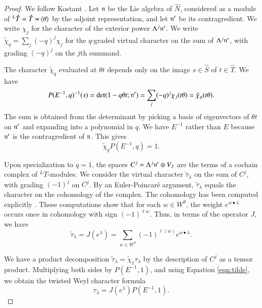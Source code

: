 \begin{proof} We follow Kostant \cite{kostant1961lie}.
Let ${\mathfrak n}$ be the Lie algebra of $\hat N$, considered as a module of ${}^L\hat T=\hat T\rtimes\langle{\theta}\rangle$ by the adjoint representation,
and let ${\mathfrak n}'$ be its contragredient.  We write $\chi_j$ for the character of the exterior power $\Lambda^j {\mathfrak n}'$.
  We write $\tilde\chi_q = \sum_j (-q)^j\chi_j$
for the $q$-graded virtual character on the sum of $\Lambda^j {\mathfrak n}'$, with grading $(-q)^j$ on the $j$th summand.  

The character $\tilde\chi_q$ evaluated at $\theta t$ depends only on the image $s\in\hat S$ of $t\in \hat T$.
We have 
\[
P(E^{-1},q)^{-1}(s) = \det(1- q\theta t;{\mathfrak n}') = \sum_j (-q)^j \chi_j(t\theta) = \tilde\chi_q(t\theta).
\]
The sum is obtained from
 the determinant  by picking a basis of eigenvectors of $\theta t$ on ${\mathfrak n}'$ and expanding into a polynomial
in $q$.
We have $E^{-1}$ rather than $E$ because ${\mathfrak n}'$ is the contragredient of ${\mathfrak n}$.
This gives
\begin{equation}\label{eqn:tilde}
\tilde\chi_q P(E^{-1},q) = 1.
\end{equation}

Upon specialization to $q=1$, 
the spaces $C^j=\Lambda^j {\mathfrak n}'\otimes V_\lambda$ are the terms of a cochain complex of ${}^LT$-modules.
We consider the virtual character $\tilde \tau_\lambda$ on  
the sum of $C^j$, with grading $(-1)^j$ on $C^j$.  
By an Euler-Poincar\'e argument, 
$\tilde\tau_\lambda$ equals the character on the cohomology of the complex.  The cohomology has 
been computed explicitly \cite{kostant1961lie}.
These computations show that for each $w\in W^\theta$, the weight $e^{w\bullet \lambda}$ 
occurs once in cohomology with sign $(-1)^{\ell w}$.
Thus, in terms of the operator $J$, we have
\[
\tilde \tau_\lambda = J(e^\lambda) = \sum_{w\in W^\theta} (-1)^{\ell(w)} e^{w\bullet\lambda}.
\]

We have  a product decomposition $\tilde \tau_\lambda = \tilde \chi_{1}\tau_\lambda $ by the description of $C^j$ as
a tensor product.
Multiplying both sides by $P(E^{-1},1)$, and using
Equation \ref{eqn:tilde}, we obtain the twisted Weyl character formula
\begin{equation}
\tau_\lambda = J(e^\lambda) P(E^{-1},1).
\end{equation}
\end{proof}

